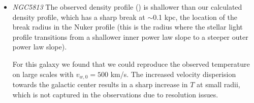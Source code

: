 \documentclass[usenatbib,fleqn]{mn2e}
\newcommand{\vwO}{v_{w,0}}
\begin{document}
\begin{itemize}


\item \emph{NGC5813} %
  The observed density profile (\citealt{RussellMcNamara+:2013a}) is
  shallower than our calculated density profile, which has a sharp
  break at $\sim$0.1 kpc, the location of the break radius in the
  Nuker profile (this is the radius where the stellar light profile
  transitions from a shallower inner power law slope to a steeper
  outer power law slope).

  For this galaxy we found that we could reproduce the observed
  temperature on large scales with $\vwO=500$ km/s. The increased
  velocity disperision towards the galactic center results in a sharp
  increase in $T$ at small radii, which is not captured in the
  observations due to resolution issues.
\end{itemize}
\end{document}
